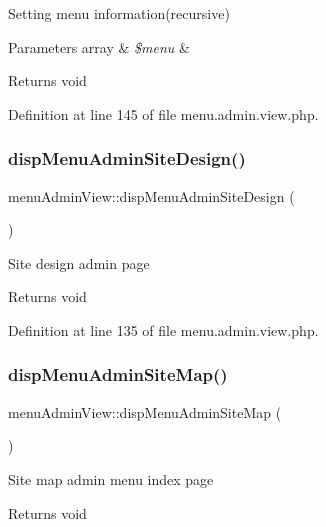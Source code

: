 Setting menu information(recursive) 
\begin{DoxyParams}[1]{Parameters}
array & {\em \$menu} & \\
\hline
\end{DoxyParams}
\begin{DoxyReturn}{Returns}
void 
\end{DoxyReturn}


Definition at line 145 of file menu.\+admin.\+view.\+php.

\hypertarget{classmenuAdminView_a29d653c99c2e86ed5b8324042ef447ba}{}\label{classmenuAdminView_a29d653c99c2e86ed5b8324042ef447ba} 
\subsubsection{\texorpdfstring{disp\+Menu\+Admin\+Site\+Design()}{dispMenuAdminSiteDesign()}}
{\footnotesize\ttfamily menu\+Admin\+View\+::disp\+Menu\+Admin\+Site\+Design (\begin{DoxyParamCaption}{ }\end{DoxyParamCaption})}

Site design admin page \begin{DoxyReturn}{Returns}
void 
\end{DoxyReturn}


Definition at line 135 of file menu.\+admin.\+view.\+php.

\hypertarget{classmenuAdminView_afa55cc43041d721b52b8504c3b34e625}{}\label{classmenuAdminView_afa55cc43041d721b52b8504c3b34e625} 
\subsubsection{\texorpdfstring{disp\+Menu\+Admin\+Site\+Map()}{dispMenuAdminSiteMap()}}
{\footnotesize\ttfamily menu\+Admin\+View\+::disp\+Menu\+Admin\+Site\+Map (\begin{DoxyParamCaption}{ }\end{DoxyParamCaption})}

Site map admin menu index page \begin{DoxyReturn}{Returns}
void 
\end{DoxyReturn}


